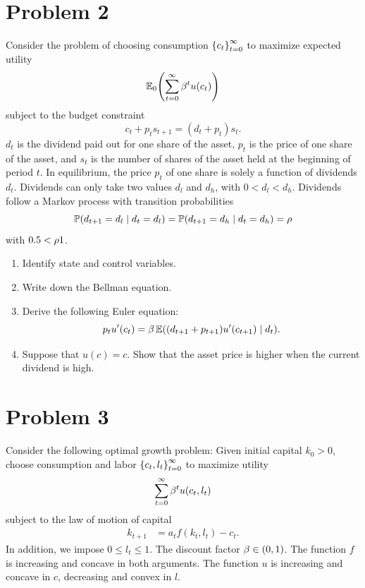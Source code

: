 \documentclass[letterpaper, 11pt, leqno]{article}
\begin{document}
\section*{Problem 2}

Consider the problem of choosing consumption $\left\lbrace c_{t} \right\rbrace_{t=0}^{\infty}$ to maximize expected utility
\begin{equation*}
\E[0]{\sum_{t=0}^{\infty}\b^{t} u(c_{t})}
\end{equation*}
subject to the budget constraint
\begin{equation*}
c_{t}+p_{t} s_{t+1}=(d_{t}+p_{t}) s_{t}.
\end{equation*}
$d_{t}$ is the dividend paid out for one share of the asset, $p_{t}$ is the price of one share of the asset, and $s_{t}$ is the number of shares of the asset held at the beginning of period $t$. In equilibrium, the price $p_{t}$ of one share is solely a function of dividends $d_{t}$. Dividends can only take two values $d_{l}$ and $d_{h}$, with $0<d_{l}<d_{h}$. Dividends follow a Markov process with transition probabilities 
\begin{equation*}
\P{d_{t+1}=d_{l}\mid d_{t}=d_{l}} =\P{d_{t+1}=d_{h}\mid d_{t}=d_{h}} =\r
\end{equation*}
with $0.5<\rho 1$.

\begin{enumerate}
\item Identify state and control variables. 
\item Write down the Bellman equation.
\item Derive the following Euler equation: 
\begin{equation*}
p_{t} u'(c_{t}) =\b  \E{(d_{t+1}+p_{t+1})  u'(c_{t+1}) \mid d_{t}} .
\end{equation*}
\item Suppose that $u(c) =c$. Show that the asset price is higher when the current dividend is high.
\end{enumerate}

\section*{Problem 3}

Consider the following optimal growth problem: Given initial capital $k_{0}>0$, choose consumption and labor $\left\lbrace c_{t},l_{t} \right\rbrace_{t=0}^{\infty}$ to maximize utility
\begin{equation*}
\sum_{t=0}^{\infty}\beta^{t} u(c_{t},l_{t})
\end{equation*}
subject to the law of motion of capital
\begin{align*}
k_{t+1}&=a_{t} f(k_{t},l_{t}) -c_{t}.
\end{align*}
In addition, we impose $0\le l_{t}\le 1$. The discount factor $\beta \in (0,1)$. The function $f$ is increasing and concave in both arguments. The function $u$ is increasing and concave in $c$, decreasing and convex in $l$. 
\end{document}
